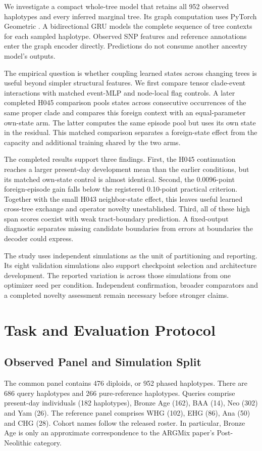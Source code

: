 \documentclass[letterpaper]{article}
\begin{document}
We investigate a compact whole-tree model that retains all 952 observed haplotypes and every inferred marginal tree. Its graph computation uses PyTorch Geometric \citep{pyg2019}. A bidirectional GRU \citep{gru2014} models the complete sequence of tree contexts for each sampled haplotype. Observed SNP features and reference annotations enter the graph encoder directly. Predictions do not consume another ancestry model's outputs.

The empirical question is whether coupling learned states across changing trees is useful beyond simpler structural features. We first compare tensor clade-event interactions with matched event-MLP and node-local flag controls. A later completed H045 comparison pools states across consecutive occurrences of the same proper clade and compares this foreign context with an equal-parameter own-state arm. The latter computes the same episode pool but uses its own state in the residual. This matched comparison separates a foreign-state effect from the capacity and additional training shared by the two arms.

The completed results support three findings. First, the H045 continuation reaches a larger present-day development mean than the earlier conditions, but its matched own-state control is almost identical. Second, the 0.0096-point foreign-episode gain falls below the registered 0.10-point practical criterion. Together with the small H043 neighbor-state effect, this leaves useful learned cross-tree exchange and operator novelty unestablished. Third, all of these high span scores coexist with weak tract-boundary prediction. A fixed-output diagnostic separates missing candidate boundaries from errors at boundaries the decoder could express.

The study uses independent simulations as the unit of partitioning and reporting. Its eight validation simulations also support checkpoint selection and architecture development. The reported variation is across those simulations from one optimizer seed per condition. Independent confirmation, broader comparators and a completed novelty assessment remain necessary before stronger claims.

\section{Task and Evaluation Protocol}
\subsection{Observed Panel and Simulation Split}
The common panel contains 476 diploids, or 952 phased haplotypes. There are 686 query haplotypes and 266 pure-reference haplotypes. Queries comprise present-day individuals (182 haplotypes), Bronze Age (162), BAA (14), Neo (302) and Yam (26). The reference panel comprises WHG (102), EHG (86), Ana (50) and CHG (28). Cohort names follow the released roster. In particular, Bronze Age is only an approximate correspondence to the ARGMix paper's Post-Neolithic category.
\end{document}
